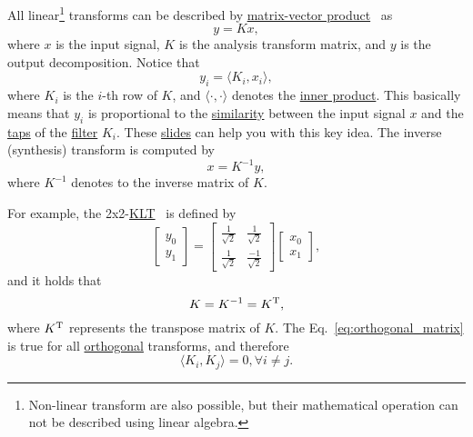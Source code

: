 All linear\footnote{Non-linear transform are also possible, but their
  mathematical operation can not be described using linear algebra.}
transforms can be described by
\href{https://en.wikipedia.org/wiki/Matrix_multiplication}{matrix-vector
  product}~\cite{strang4linear} as
\begin{equation}
  y = Kx,
  \label{eq:forward_transform_matrix_form}
\end{equation}
where $x$ is the input signal, $K$ is the analysis transform matrix,
and $y$ is the output decomposition. Notice that
\begin{equation}
  y_i = \langle K_i, x_i\rangle,
\end{equation}
where $K_i$ is the $i$-th row of $K$, and $\langle\cdot,\cdot\rangle$
denotes the
\href{https://mathworld.wolfram.com/InnerProduct.html}{inner
  product}. This basically means that $y_i$ is proportional to the
\href{https://en.wikipedia.org/wiki/Similarity_(geometry)}{similarity}
between the input signal $x$ and the
\href{https://en.wikipedia.org/wiki/Finite_impulse_response}{taps} of
the \href{https://en.wikipedia.org/wiki/Digital_filter}{filter}
$K_i$. These
\href{https://cseweb.ucsd.edu/classes/fa17/cse166-a/lec13.pdf}{slides}
can help you with this key idea. The inverse (synthesis) transform is
computed by
\begin{equation}
  x = K^{-1}y,
  \label{eq:backward_transform_matrix_form}
\end{equation}
where $K^{-1}$ denotes to the inverse matrix of $K$.

For example, the
2x2-\href{https://en.wikipedia.org/wiki/Karhunen-Loeve_theorem}{KLT}~\cite{sayood2017introduction}
is defined by
\begin{equation}
  \begin{bmatrix}
    y_0 \\
    y_1
  \end{bmatrix}
  = 
  \begin{bmatrix} \frac{1}{\sqrt{2}} & \frac{1}{\sqrt{2}} \\ \frac{1}{\sqrt{2}} & \frac{-1}{\sqrt{2}} \end{bmatrix}
  \begin{bmatrix}
    x_0 \\
    x_1
  \end{bmatrix},
  \label{eq:KLT_transform}
\end{equation}
and it holds that
\begin{equation}
  K=K^{-1}=K^{\text T},
  \label{eq:orthogonal_matrix}
\end{equation}
where $K^{\text T}$ represents the transpose matrix of $K$. The
Eq.~\ref{eq:orthogonal_matrix} is true for all
\href{https://en.wikipedia.org/wiki/Orthogonality}{orthogonal}
transforms, and therefore
\begin{equation}
  \langle K_i, K_j\rangle = 0, \forall i\neq j.
\end{equation}

